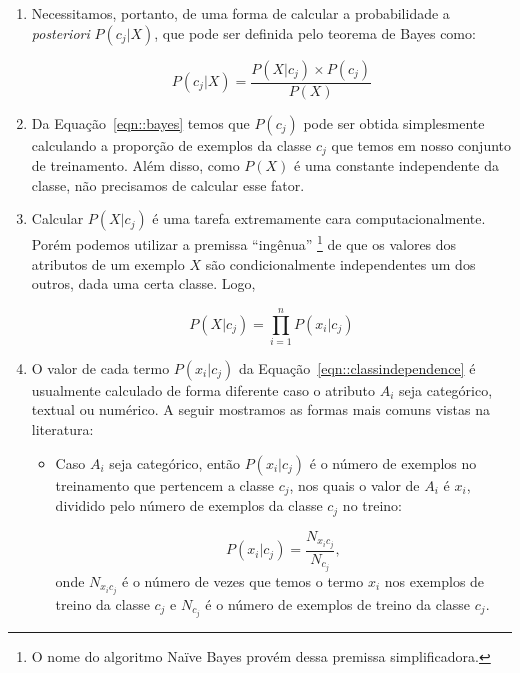 \begin{enumerate}
    \item Necessitamos, portanto, de uma forma de calcular a probabilidade a \textit{posteriori} $P(c_j| X)$, que pode ser definida pelo teorema de Bayes como:
 
\begin{equation}\label{eqn::bayes}
   P(c_{j}|X) = \frac{P(X|c_j) \times P(c_j) }{P(X)}
\end{equation}

    \item Da Equação~\ref{eqn::bayes} temos que $P(c_j)$ pode ser obtida simplesmente calculando a proporção de exemplos da classe $c_j$ que temos em nosso conjunto de treinamento. Além disso, como $P(X)$ é uma constante independente da classe, não precisamos de calcular esse fator.
       
    \item Calcular $P(X|c_j)$ é uma tarefa extremamente cara computacionalmente. Porém podemos utilizar a premissa ``ingênua'' \footnote{O nome do algoritmo Naïve Bayes provém dessa premissa simplificadora.} de que os valores dos atributos de um exemplo $X$ são condicionalmente independentes um dos outros, dada uma certa classe. Logo,

\begin{equation}\label{eqn::classindependence}
   P(X|c_{j}) = \prod^{n}_{i=1}{P(x_i|c_j) }
\end{equation}

\item O valor de cada termo $P(x_i|c_j)$ da Equação~\ref{eqn::classindependence} é usualmente calculado de forma diferente caso o atributo $A_i$ seja categórico, textual ou numérico. A seguir mostramos as formas mais comuns vistas na literatura:
    \begin{itemize}

        \item Caso $A_i$ seja categórico, então $P(x_i|c_j)$ é o número de exemplos no treinamento que pertencem a classe $c_j$, nos quais o valor de $A_i$ é $x_i$, dividido pelo número de exemplos da classe $c_j$ no treino:

    \begin{equation}\label{eqn::nbcattexto}
        P(x_i|c_j) = \frac{ N_{x_{i}c_{j}} }{ N_{c_{j}} },
    \end{equation}
        onde $N_{x_{i}c_{j}}$ é o número de vezes que temos o termo $x_i$ nos exemplos de treino da classe $c_j$ e $N_{c_{j}}$ é o número de exemplos de treino da classe $c_j$.
        

\end{itemize}
\end{enumerate}
